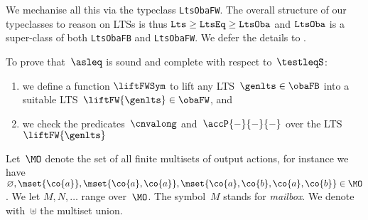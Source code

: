 We mechanise all this via the typeclass
\texttt{LtsObaFW}. The overall structure of our typeclasses to reason on LTSs is thus
  $\text{\texttt{Lts}} \geq \text{\texttt{LtsEq}}\geq \text{\texttt{LtsOba}}$ and
  $\text{\texttt{LtsOba}}$ is a super-class of both \texttt{LtsObaFB} and \texttt{LtsObaFW}.
We defer the details to .


To prove that~$\asleq$ is sound and complete with respect to~$\testleqS$:
\begin{enumerate} \item we define a function $\liftFWSym$ to lift any
  LTS~$\genlts \in \obaFB$ into a suitable
  LTS~$\liftFW{\genlts}\in \obaFW$,
  and \item we check the
  predicates~$\cnvalong$ and~$\accP{-}{-}{-}$ over the LTS~$\liftFW{\genlts}$
\end{enumerate}



Let~$\MO$ denote the set of all finite multisets of output actions, 
for instance we have $\varnothing, \mset{ \co{ a } }, \mset{ \co{ a },   \co{
    a }  }, \mset{ \co{ a },  \co{ b },  \co{ a },  \co{ b }} \in
\MO$.
We let %
$M, N, \ldots$ range over~$\MO$. The symbol~$M$ stands for {\em mailbox}.
We denote with~$\uplus$ the multiset union.



